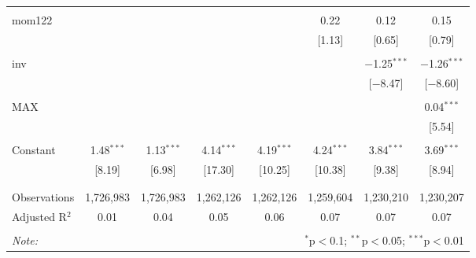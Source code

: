 \documentclass[12pt]{article}
\begin{document}
\begin{table}[!htbp]
\begin{tabular}{@{\extracolsep{0pt}}lccccccc}
  & & & & & & & \\ 
 mom122 &  &  &  &  & 0.22 & 0.12 & 0.15 \\ 
  &  &  &  &  & [1.13] & [0.65] & [0.79] \\ 
  & & & & & & & \\ 
 inv &  &  &  &  &  & $-$1.25$^{***}$ & $-$1.26$^{***}$ \\ 
  &  &  &  &  &  & [$-$8.47] & [$-$8.60] \\ 
  & & & & & & & \\ 
 MAX &  &  &  &  &  &  & 0.04$^{***}$ \\ 
  &  &  &  &  &  &  & [5.54] \\ 
  & & & & & & & \\ 
 Constant & 1.48$^{***}$ & 1.13$^{***}$ & 4.14$^{***}$ & 4.19$^{***}$ & 4.24$^{***}$ & 3.84$^{***}$ & 3.69$^{***}$ \\ 
  & [8.19] & [6.98] & [17.30] & [10.25] & [10.38] & [9.38] & [8.94] \\ 
  & & & & & & & \\ 
\hline \\[-1.8ex] 
Observations & 1,726,983 & 1,726,983 & 1,262,126 & 1,262,126 & 1,259,604 & 1,230,210 & 1,230,207 \\ 
Adjusted R$^{2}$ & 0.01 & 0.04 & 0.05 & 0.06 & 0.07 & 0.07 & 0.07 \\ 
\hline 
\hline \\[-1.8ex] 
\textit{Note:}  & \multicolumn{7}{r}{$^{*}$p$<$0.1; $^{**}$p$<$0.05; $^{***}$p$<$0.01} \\ 
\end{tabular} 
\end{table}


\clearpage
\end{document}
